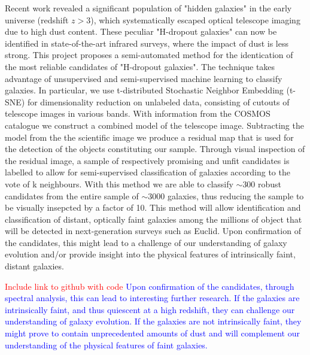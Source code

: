 Recent work revealed a significant population of "hidden galaxies" in the early universe (redshift $z>3$), which systematically escaped optical telescope imaging due to high dust content. These peculiar "H-dropout galaxies" can now be identified in state-of-the-art infrared surveys, where the impact of dust is less strong.
This project proposes a semi-automated method for the identication of the most reliable candidates of "H-dropout galaxies". The technique takes advantage of unsupervised and semi-supervised machine learning to classify galaxies. In particular, we use t-distributed Stochastic Neighbor Embedding (t-SNE) for dimensionality reduction on unlabeled data, consisting of cutouts of telescope images in various bands. With information from the COSMOS catalogue we construct a combined model of the telescope image. Subtracting the model from the the scientific image we produce a residual map that is used for the detection of the objects constituting our sample. Through visual inspection of the residual image, a sample of respectively promising and unfit candidates is labelled to allow for semi-supervised classification of galaxies according to the vote of k neighbours. With this method we are able to classify $\sim300$ robust candidates from the entire sample of $\sim3000$ galaxies, thus reducing the sample to be visually insepcted by a factor of 10. This method will allow identification and classification of distant, optically faint galaxies among the millions of object that will be detected in next-generation surveys such as Euclid. Upon confirmation of the candidates, this might lead to a challenge of our understanding of galaxy evolution and/or provide insight into the physical features of intrinsically faint, distant galaxies.

\textcolor{red}{Include link to github with code}
\textcolor{blue}{Upon confirmation of the candidates, through spectral analysis, this can lead to interesting further research. If the galaxies are intrinsically faint, and thus quiescent at a high redshift, they can challenge our understanding of galaxy evolution. If the galaxies are not intrinsically faint, they might prove to contain unprecedented amounts of dust and will complement our understanding of the physical features of faint galaxies.}
